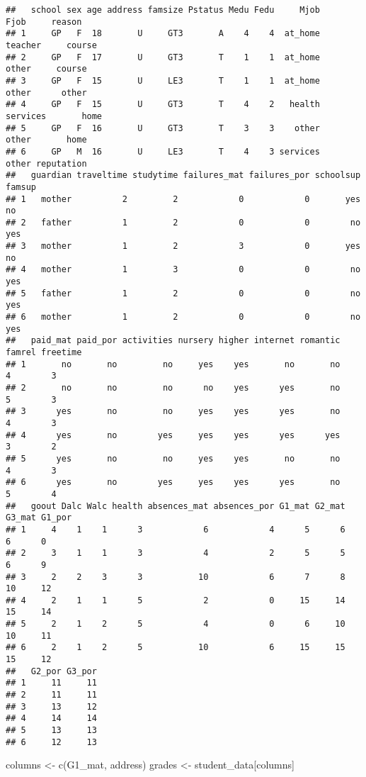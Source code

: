 \documentclass[
]{article}
\newenvironment{Shaded}{\begin{snugshade}}{\end{snugshade}}
\newcommand{\FunctionTok}[1]{\textcolor[rgb]{0.00,0.00,0.00}{#1}}
\newcommand{\NormalTok}[1]{#1}
\newcommand{\OtherTok}[1]{\textcolor[rgb]{0.56,0.35,0.01}{#1}}
\newcommand{\StringTok}[1]{\textcolor[rgb]{0.31,0.60,0.02}{#1}}
\begin{document}
\begin{verbatim}
##   school sex age address famsize Pstatus Medu Fedu     Mjob     Fjob     reason
## 1     GP   F  18       U     GT3       A    4    4  at_home  teacher     course
## 2     GP   F  17       U     GT3       T    1    1  at_home    other     course
## 3     GP   F  15       U     LE3       T    1    1  at_home    other      other
## 4     GP   F  15       U     GT3       T    4    2   health services       home
## 5     GP   F  16       U     GT3       T    3    3    other    other       home
## 6     GP   M  16       U     LE3       T    4    3 services    other reputation
##   guardian traveltime studytime failures_mat failures_por schoolsup famsup
## 1   mother          2         2            0            0       yes     no
## 2   father          1         2            0            0        no    yes
## 3   mother          1         2            3            0       yes     no
## 4   mother          1         3            0            0        no    yes
## 5   father          1         2            0            0        no    yes
## 6   mother          1         2            0            0        no    yes
##   paid_mat paid_por activities nursery higher internet romantic famrel freetime
## 1       no       no         no     yes    yes       no       no      4        3
## 2       no       no         no      no    yes      yes       no      5        3
## 3      yes       no         no     yes    yes      yes       no      4        3
## 4      yes       no        yes     yes    yes      yes      yes      3        2
## 5      yes       no         no     yes    yes       no       no      4        3
## 6      yes       no        yes     yes    yes      yes       no      5        4
##   goout Dalc Walc health absences_mat absences_por G1_mat G2_mat G3_mat G1_por
## 1     4    1    1      3            6            4      5      6      6      0
## 2     3    1    1      3            4            2      5      5      6      9
## 3     2    2    3      3           10            6      7      8     10     12
## 4     2    1    1      5            2            0     15     14     15     14
## 5     2    1    2      5            4            0      6     10     10     11
## 6     2    1    2      5           10            6     15     15     15     12
##   G2_por G3_por
## 1     11     11
## 2     11     11
## 3     13     12
## 4     14     14
## 5     13     13
## 6     12     13
\end{verbatim}

\begin{Shaded}
\begin{Highlighting}[]
\NormalTok{columns }\OtherTok{\textless{}{-}} \FunctionTok{c}\NormalTok{(}\StringTok{\textquotesingle{}G1\_mat\textquotesingle{}}\NormalTok{, }\StringTok{\textquotesingle{}address\textquotesingle{}}\NormalTok{)}
\NormalTok{grades }\OtherTok{\textless{}{-}}\NormalTok{ student\_data[columns]}
\end{Highlighting}
\end{Shaded}
\end{document}
